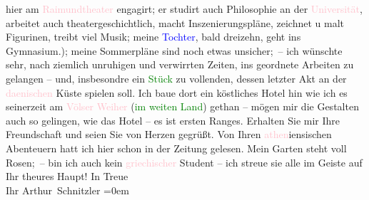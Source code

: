                     hier am \textcolor{pink}{Raimundtheater}{}\ledrightnote{\textcolor{pink}{Raimund-Theater}} engagirt; er studirt auch
                    Philosophie an der \textcolor{pink}{Universität}{}, arbeitet auch theatergeschichtlich, macht
                    Inszenierungspläne, zeichnet u malt Figurinen, treibt viel Musik; meine \textcolor{blue}{Tochter}{}, bald dreizehn,
                    geht ins Gymnasium.); meine Sommer{\pb}pläne sind
                    noch etwas unsicher; – ich wünschte sehr, nach ziemlich unruhigen und verwirrten
                    Zeiten, ins geordnete Arbeiten zu gelangen – und, insbesondre ein \textcolor{green}{Stück}{} zu vollenden, dessen
                    letzter Akt an der \textcolor{pink}{daenischen}{}\ledrightnote{\textcolor{pink}{Dänemark}} Küste spielen
                    soll. Ich baue dort ein köstliches Hotel hin wie ich es seinerzeit am \textcolor{pink}{Völser Weiher}{}\ledrightnote{\textcolor{pink}{Völser Weiher}} (\textcolor{green}{im weiten Land}{}\ledrightnote{\textcolor{green}{Das weite Land. Tragikomödie in fünf Akten}}) gethan – mögen mir die Gestalten auch so gelingen, wie
                    das Hotel – es ist ersten Ranges.\pend
           \pstart
           Erhalten Sie mir Ihre Freundschaft und seien Sie von Herzen gegrüßt.\pend
           \pstart
           Von Ihren \textcolor{pink}{athen}{}\ledrightnote{\textcolor{pink}{Athen}}iensischen Abenteuern hatt ich
                    hier schon in der Zeitung gelesen. Mein Garten steht voll Rosen; – bin ich auch
                    kein \textcolor{pink}{griechischer}{}\ledrightnote{\textcolor{pink}{Griechenland}} Student – ich streue sie
                    alle im Geiste auf Ihr theures Haupt!\pend
           \pstart
           In Treue{\\[\baselineskip]}Ihr \spacefill\mbox{Arthur Schnitzler}\pend
           \leftskip=0em{}\endnumbering{}  
      